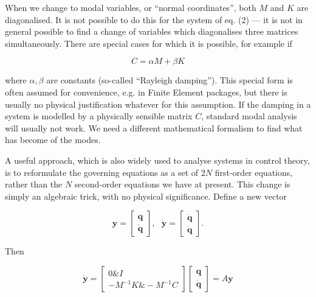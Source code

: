   When we change to modal variables, or ``normal coordinates'', both $M$ and 
  $K$ are diagonalised. It is not possible to do this for the system of eq. (2) 
  — it is not in general possible to find a change of variables which 
  diagonalises three matrices simultaneously. There are special cases for which 
  it is possible, for example if 

  \begin{equation*}C= \alpha M + \beta K \tag{7}\end{equation*} 

  \noindent{}where $\alpha, \beta$ are constants (so-called ``Rayleigh 
  damping''). This special form is often assumed for convenience, e.g. in 
  Finite Element packages, but there is usually no physical justification 
  whatever for this assumption. If the damping in a system is modelled by a 
  physically sensible matrix $C$, standard modal analysis will usually not 
  work. We need a different mathematical formalism to find what has become of 
  the modes. 

  A useful approach, which is also widely used to analyse systems in control 
  theory, is to reformulate the governing equations as a set of $2N$ 
  first-order equations, rather than the $N$ second-order equations we have at 
  present. This change is simply an algebraic trick, with no physical 
  significance. Define a new vector 

  \begin{equation*}\mathbf{y} = \begin{bmatrix}\mathbf{q}\\ 
  \dot{\mathbf{q}}\end{bmatrix},~~~\dot{\mathbf{y}} = 
  \begin{bmatrix}\dot{\mathbf{q}}\\\ddot{\mathbf{q}}\end{bmatrix} . 
  \tag{8}\end{equation*} 

  Then 

  \begin{equation*}\dot{\mathbf{y}} = \begin{bmatrix}0 \& I\\ -M^{-1}K \& 
  -M^{-1}C\end{bmatrix} \begin{bmatrix}\mathbf{q}\\ 
  \dot{\mathbf{q}}\end{bmatrix} = A \mathbf{y} \tag{9}\end{equation*} 

